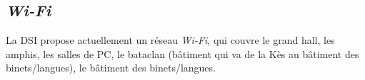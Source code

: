 \subsection{\emph{Wi-Fi}}
La DSI propose actuellement un réseau \emph{Wi-Fi}, qui couvre le grand hall, les amphis, les salles de PC, le bataclan (bâtiment qui va de la Kès au bâtiment des
binets/langues), le bâtiment des binets/langues.


%
%

